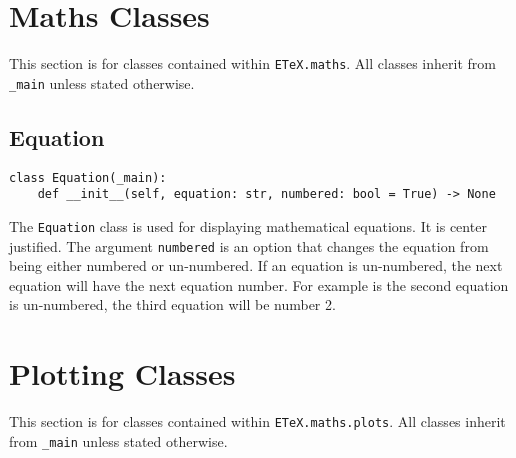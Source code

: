\documentclass{article}
\begin{document}
\section{Maths Classes}\label{sec:maths_classes}
This section is for classes contained within \verb|ETeX.maths|. All classes inherit from \verb|_main| unless stated otherwise.
\subsection{Equation}\label{subsec:equation}
\begin{verbatim}
class Equation(_main):
	def __init__(self, equation: str, numbered: bool = True) -> None
\end{verbatim}
The \verb|Equation| class is used for displaying mathematical equations. It is center justified. The argument \verb|numbered| is an option that changes the equation from being either numbered or un-numbered. If an equation is un-numbered, the next equation will have the next equation number. For example is the second equation is un-numbered, the third equation will be number 2.
\section{Plotting Classes}\label{sec:plotting_classes}
This section is for classes contained within \verb|ETeX.maths.plots|. All classes inherit from \verb|_main| unless stated otherwise.
\end{document}
